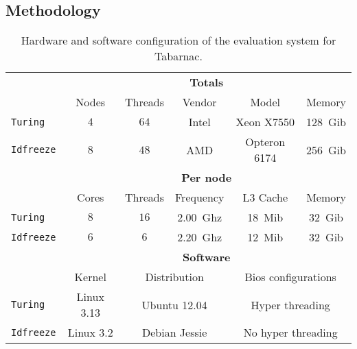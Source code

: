 \subsection{Methodology}


\begin{table}[htb]
    \centering
    \begin{tabular}{lccccc}
        \toprule
        & \multicolumn{5}{c}{\textbf{Totals}}\\
        \cmidrule(lr){2-6}
        & Nodes & Threads & Vendor & Model & Memory \\
        \cmidrule(lr){2-6}
        \texttt{Turing}   & $4$ & $64$ & Intel & Xeon X7550   & \SI{128}{Gib} \\
        \texttt{Idfreeze} & $8$ & $48$ & AMD   & Opteron 6174 & \SI{256}{Gib}\\
        \midrule
        & \multicolumn{5}{c}{\textbf{Per node}}\\
        \cmidrule(lr){2-6}
        & Cores & Threads & Frequency & L3 Cache & Memory \\
        \cmidrule(lr){2-6}
        \texttt{Turing}   & $8$ & $16$ & \SI{2.00}{Ghz}& \SI{18}{Mib} & \SI{32}{Gib} \\
        \texttt{Idfreeze} & $6$ & $6$  & \SI{2.20}{Ghz}& \SI{12}{Mib} & \SI{32}{Gib}\\
        \midrule
        & \multicolumn{5}{c}{\textbf{Software}}\\
        \cmidrule(lr){2-6}
        & Kernel & \multicolumn{2}{c}{Distribution} &
            \multicolumn{2}{c}{Bios configurations} \\
        \cmidrule(lr){2-6}
        \texttt{Turing}   & Linux 3.13 & \multicolumn{2}{c}{Ubuntu 12.04} &
            \multicolumn{2}{c}{Hyper threading} \\
        \texttt{Idfreeze} & Linux 3.2 & \multicolumn{2}{c}{Debian Jessie} &
            \multicolumn{2}{c}{No hyper threading}\\
        \bottomrule
    \end{tabular}
    \caption{Hardware and software configuration of the evaluation system for Tabarnac.}
    \label{tab:turing-hw}
\end{table}

